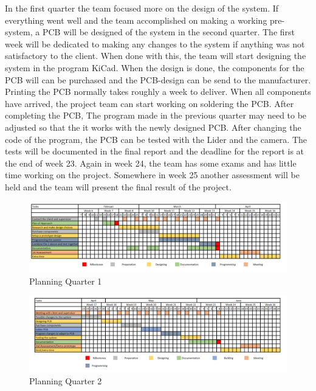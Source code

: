 In the first quarter the team focused more on the design of the system. If everything went well and the team accomplished on making a working pre-system, a PCB will be designed of the system in the second quarter. The first week will be dedicated to making any changes to the system if anything was not satisfactory to the client. When done with this, the team will start designing the system in the program KiCad. When the design is done, the components for the PCB will can be purchased and the PCB-design can be send to the manufacturer. Printing the PCB normally takes roughly a week to deliver. When all components have arrived, the project team can start working on soldering the PCB. After completing the PCB, The program made in the previous quarter may need to be adjusted so that the it works with the newly designed PCB. After changing the code of the program, the PCB can be tested with the Lider and the camera. The tests will be documented in the final report and the deadline for the report is at the end of week 23. Again in week 24, the team has some exams and has little time working on the project. Somewhere in week 25 another assessment will be held and the team will present the final result of the project.

\newpage

\begin{landscape}

\begin{figure}
    \centering
    \includegraphics[scale = 0.7]{images/Planning_Lider_Q1.png}
    \caption{Planning Quarter 1}
    \label{fig:PQ1}
\end{figure}

\begin{figure}
    \centering
    \includegraphics[scale = 0.7]{images/Planning_Lider_Q2.png}
    \caption{Planning Quarter 2}
    \label{fig:PQ2}
\end{figure}

\end{landscape}